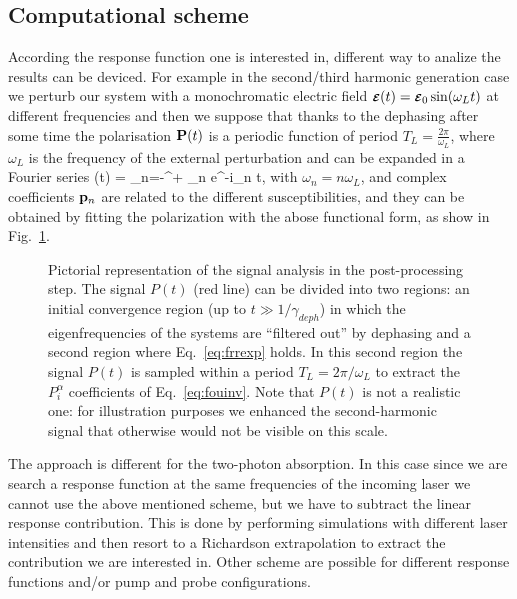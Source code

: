 \subsection{Computational scheme}\label{sc:compdet}
According the response function one is interested in, different way to analize the results can be deviced. For example in the  second/third harmonic generation case we perturb our system with  a monochromatic electric field $\boldsymbol{\scriptstyle \cal E}(t) = \boldsymbol{\scriptstyle \cal E}_0 \sin(\omega_L t)$ at different frequencies and then we suppose that thanks to the dephasing after some time the  polarisation ${\bf P}(t)$ is a periodic function of period $T_L =\frac{2\pi}{\omega_L}$, where $\omega_L$ is the frequency of the external perturbation and can be expanded in a Fourier series
\be\label{eq:frrexp}
\PP(t) = \sum_{n=-\infty}^{+\infty} \pp_n e^{-i\omega_n t},
\ee  
with $\omega_n = n \omega_L$, and complex coefficients ${\bf p}_n$ are related to the different susceptibilities, and they can be obtained by fitting the polarization with the abose functional form, as show in Fig.~\ref{fg:ptanalysis}. 
\begin{figure}[ht]
\centering
{}
\caption{\footnotesize{Pictorial representation of the signal analysis in the post-processing step. The signal  $P(t)$ (red line) can be divided into two regions: an initial convergence region (up to $t\gg 1/\gamma_{deph}$) in which the eigenfrequencies of the systems are ``filtered out'' by dephasing and a second region where Eq.~\eqref{eq:frrexp} holds. In this second region the signal $P(t)$ is sampled within a period $T_L=2\pi/\omega_L$ to extract the $P^\alpha_i$ coefficients of Eq.~\ref{eq:fouinv}. Note that $P(t)$ is not a realistic one: for illustration purposes we enhanced the second-harmonic signal that otherwise would not be visible on this scale.}} 
\label{fg:ptanalysis}
\end{figure} 

The approach is different for the two-photon absorption. In this case since we are search a response function at the same frequencies of the incoming laser we cannot use the above mentioned scheme, but we have to subtract the linear response contribution. This is done by performing simulations with different laser intensities and then  resort to a Richardson extrapolation to extract the contribution we are interested in.\cite{attaccalite2018two} Other scheme are possible for different response functions and/or pump and probe configurations.
